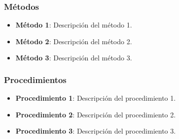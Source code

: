 \subsubsection{Métodos}
\label{subsubsec:metodologia_metodos}

\begin{itemize}
    \item \textbf{Método 1}: Descripción del método 1.
    \item \textbf{Método 2}: Descripción del método 2.
    \item \textbf{Método 3}: Descripción del método 3.
\end{itemize}

\subsubsection{Procedimientos}
\label{subsubsec:metodologia_procedimientos}

\begin{itemize}
    \item \textbf{Procedimiento 1}: Descripción del procedimiento 1.
    \item \textbf{Procedimiento 2}: Descripción del procedimiento 2.
    \item \textbf{Procedimiento 3}: Descripción del procedimiento 3.
\end{itemize}